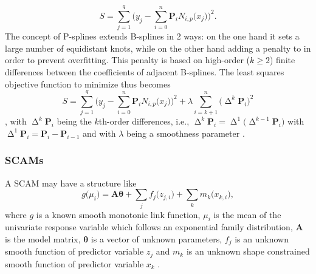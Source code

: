 \begin{equation}
  \label{eq:BSplineOLS}
  S =
  \sum_{j = 1}^q 
  \Biggl(
  y_j - \sum_{i = 0}^n \symbf{P}_i N_{i, p}\bigl(x_j\bigr)
  \Biggr)^2.
\end{equation}
The concept of P-splines extends B-splines in 2 ways: on the one hand it sets a large number of equidistant knots, while on the other hand adding a penalty to  in order to prevent overfitting.  This penalty is based on high-order (\(k \geq 2\)) finite differences between the coefficients of adjacent B-splines.  The least squares objective function to minimize thus becomes
\begin{equation}
  \label{eq:PSplineOLS}
  S =
  \sum_{j = 1}^q 
  \Biggl(
  y_j - \sum_{i = 0}^n \symbf{P}_i N_{i, p}\bigl(x_j\bigr)
  \Biggr)^2
  + \lambda \sum_{i = k + 1}^n \bigl(\upDelta^k \symbf{P}_i\bigr)^2
\end{equation}
\parencite{Eilers1996}, with \(\upDelta^k \symbf{P}_i\) being the \(k\)th-order differences, i.e., \(\upDelta^k\symbf{P}_i = \upDelta^1 \bigl(\upDelta^{k - 1} \symbf{P}_i\bigr)\) with \(\upDelta^1 \symbf{P}_i = \symbf{P}_i - \symbf{P}_{i - 1}\) and with \(\lambda\) being a smoothness parameter \parencite{Bollaerts2006}.

\subsubsection{SCAMs}

A SCAM may have a structure like
\begin{equation}
  \label{eq:SCAM}
  g\bigl(\mu_i\bigr) = \symbf{A} \symbf{\theta} + \sum_j f_j\bigl(z_{j, i}\bigr) + \sum_k m_k\bigl(x_{k, i}\bigr),
\end{equation}
where \(g\) is a known smooth monotonic link function, \(\mu_i\) is the mean of the univariate response variable which follows an exponential family distribution, \(\symbf{A}\) is the model matrix, \(\symbf{\theta}\) is a vector of unknown parameters, \(f_j\) is an unknown smooth function of predictor variable \(z_j\) and \(m_k\) is an unknown shape constrained smooth function of predictor variable \(x_k\) \parencite{Pya2015}.


